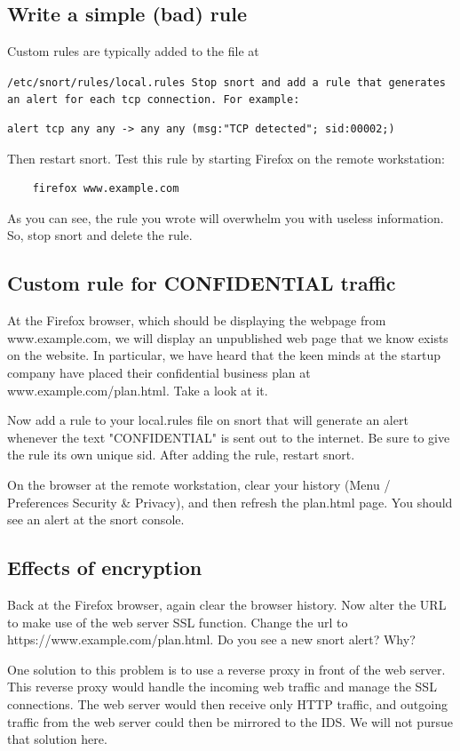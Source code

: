 \subsection{Write a simple (bad) rule}
Custom rules are typically added to the file at {\tt /etc/snort/rules/local.rules
Stop snort and add a rule that generates an alert for each tcp connection.  For example:
\begin{verbatim}
alert tcp any any -> any any (msg:"TCP detected"; sid:00002;)
\end{verbatim}

Then restart snort.  Test this rule by starting Firefox on the remote workstation:

\begin{verbatim}
    firefox www.example.com
\end{verbatim}

As you can see, the rule you wrote will overwhelm you with useless information.  So,
stop snort and delete the rule.

\subsection{Custom rule for CONFIDENTIAL traffic}
At the Firefox browser, which should be displaying the webpage from www.example.com,
we will display an unpublished web page that we know exists on the website.  In particular,
we have heard that the keen minds at the startup company have placed their confidential 
business plan at www.example.com/plan.html.  Take a look at it.

Now add a rule to your local.rules file on snort that will generate an alert 
whenever the text "CONFIDENTIAL" is sent out to the internet.  Be sure to give the
rule its own unique sid.  After adding the rule, restart snort.

On the browser at the remote workstation, clear your history (Menu / Preferences 
Security \& Privacy), and then refresh the plan.html page.  You should see an alert at
the snort console.

\subsection{Effects of encryption}
Back at the Firefox browser, again clear the browser history. Now alter the URL to make
use of the web server SSL function.  Change the url to https://www.example.com/plan.html.
Do you see a new snort alert?  Why?

One solution to this problem is to use a reverse proxy in front of the web server.  This
reverse proxy would handle the incoming web traffic and manage the SSL connections.
The web server would then receive only HTTP traffic, and outgoing traffic from the web server
could then be mirrored to the IDS.  We will not pursue that solution here.  

}
